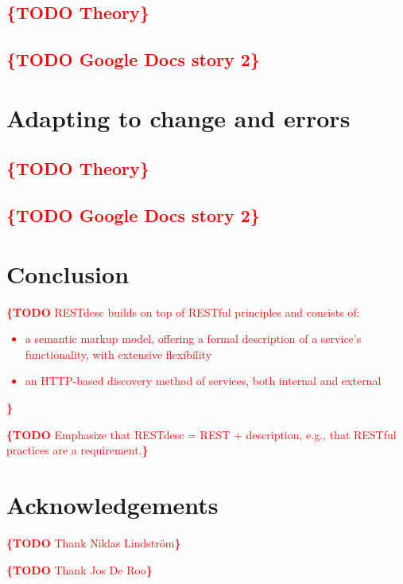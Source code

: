 \documentclass[runningheads,a4paper, twocolumn]{llncs}
\newcommand{\todo}[1]{\noindent\textcolor{red}{{\bf \{TODO} #1{\bf \}}}}
\begin{document}
\subsection{\todo{Theory}}
\subsection{\todo{Google Docs story 2}}


\section{Adapting to change and errors}
\subsection{\todo{Theory}}
\subsection{\todo{Google Docs story 2}}


\section{Conclusion}

\todo{RESTdesc builds on top of RESTful principles and consists of:
\begin{itemize}
\item a semantic markup model, offering a formal description of a service's functionality, with extensive flexibility
\item an HTTP-based discovery method of services, both internal and external
\end{itemize}
}

\todo{Emphasize that RESTdesc = REST + description, e.g., that RESTful practices are a requirement.}




\section*{Acknowledgements}
\todo{Thank Niklas Lindstr\"om}

\todo{Thank Jos De Roo}

\renewcommand{\ttdefault}{cmvtt}



\end{document}

